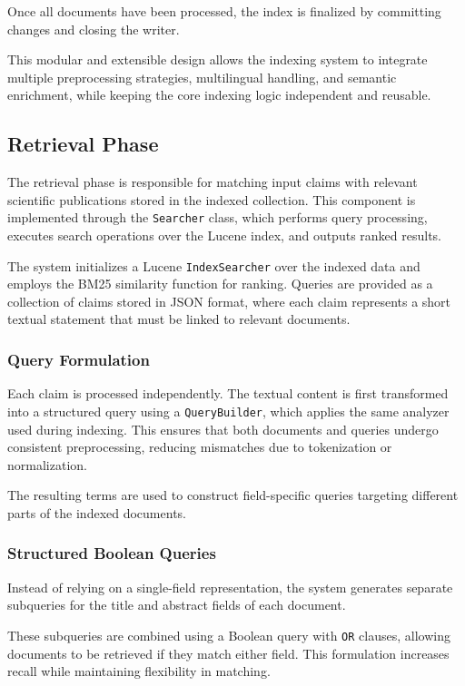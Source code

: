 Once all documents have been processed, the index is finalized by committing changes and closing the writer.

This modular and extensible design allows the indexing system to integrate multiple preprocessing strategies, multilingual handling, and semantic enrichment, while keeping the core indexing logic independent and reusable.

\subsection{Retrieval Phase}

The retrieval phase is responsible for matching input claims with relevant scientific publications stored in the indexed collection. This component is implemented through the \texttt{Searcher} class, which performs query processing, executes search operations over the Lucene index, and outputs ranked results.

The system initializes a Lucene \texttt{IndexSearcher} over the indexed data and employs the BM25 similarity function for ranking. Queries are provided as a collection of claims stored in JSON format, where each claim represents a short textual statement that must be linked to relevant documents.

\subsubsection{Query Formulation}

Each claim is processed independently. The textual content is first transformed into a structured query using a \texttt{QueryBuilder}, which applies the same analyzer used during indexing. This ensures that both documents and queries undergo consistent preprocessing, reducing mismatches due to tokenization or normalization.

The resulting terms are used to construct field-specific queries targeting different parts of the indexed documents.

\subsubsection{Structured Boolean Queries}

Instead of relying on a single-field representation, the system generates separate subqueries for the title and abstract fields of each document.

These subqueries are combined using a Boolean query with \texttt{OR} clauses, allowing documents to be retrieved if they match either field. This formulation increases recall while maintaining flexibility in matching.


